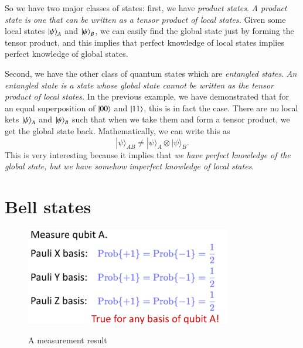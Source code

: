 So we have two major classes of states: first, we have \emph{product states}. %
\emph{A product state is one that can be written as a tensor product of local states.} Given some local states $\left| \psi \right\rangle_A$ and $\left| \psi \right\rangle_B$, we can easily find the global state just by forming the tensor product, and this implies that perfect knowledge of local states implies perfect knowledge of global states.

Second, we have the other class of quantum states which are \emph{entangled states}. \emph{An entangled state is a state whose global state cannot be written as the tensor product of local states.} In the previous example, we have demonstrated that for an equal superposition of $\left| 00 \right\rangle$ and $\left| 11 \right\rangle$, this is in fact the case. There are no local kets $\left| \psi \right\rangle_A$ and $\left| \psi \right\rangle_B$ such that when we take them and form a tensor product, we get the global state back. Mathematically, we can write this as
\begin{equation}
|\psi\rangle_{A B} \neq|\psi\rangle_{A} \otimes|\psi\rangle_{B}.
\end{equation}
This is very interesting because it implies that \emph{we have perfect knowledge of the global state, but we have somehow imperfect knowledge of local states}.

\section{Bell states}

\begin{figure}[H]
    \centering
    \includegraphics[width=0.8\textwidth]{lesson4/Qubit_A.pdf}
    \label{fig: 1}
    
        \caption{A measurement result}
    
\end{figure}

